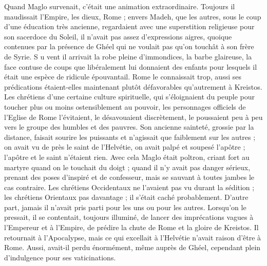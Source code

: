 \documentclass[a4paper, 11pt, oneside, polutonikogreek, french]{article}
\begin{document}
Quand Maglo survenait, c'était une animation extraordinaire. Toujours il maudissait l'Empire, les dieux, Rome ; envers Madeh, que les autres, sous le coup d'une éducation très ancienne, regardaient avec une superstition religieuse pour son sacerdoce du Soleil, il n'avait pas assez d'expressions aigres, quoique contenues par la présence de Ghéel qui ne voulait pas qu'on touchât à son frère de Syrie. S u vent il arrivait la robe pleine d'immondices, la barbe glaireuse, la face contuse de coups que libéralement lui donnaient des enfants pour lesquels il était une espèce de ridicule épouvantail. Rome le connaissait trop, aussi ses prédications étaient-elles maintenant plutôt défavorables qu'autrement à Kreistos. Les chrétiens d'une certaine culture spirituelle, qui s'éloignaient du peuple pour toucher plus ou moins ostensiblement au pouvoir, les personnages officiels de l'Eglise de Rome l'évitaient, le désavouaient discrètement, le poussaient peu à peu vers le groupe des humbles et des pauvres. Son ancienne sainteté, grossie par la distance, faisait sourire les puissants et n'agissait que faiblement sur les autres ; on avait vu de près le saint de l'Helvétie, on avait palpé et soupesé l'apôtre ; l'apôtre et le saint n'étaient rien. Avec cela Maglo était poltron, criant fort au martyre quand on le touchait du doigt ; quand il n'y avait pas danger sérieux, prenant des poses d'inspiré et de confesseur, mais se sauvant à toutes jambes le cas contraire. Les chrétiens Occidentaux ne l'avaient pas vu durant la sédition ; les chrétiens Orientaux pas davantage ; il s'était caché probablement. D'autre part, jamais il n'avait pris parti pour les uns ou pour les autres. Lorsqu'on le pressait, il se contentait, toujours illuminé, de lancer des imprécations vagues à l'Empereur et à l'Empire, de prédire la chute de Rome et la gloire de Kreistos. Il retournait à l'Apocalypse, mais ce qui excellait à l'Helvétie n'avait raison d'être à Rome. Aussi, avait-il perdu énormément, même auprès de Ghéel, cependant plein d'indulgence pour ses vaticinations.
\end{document}
